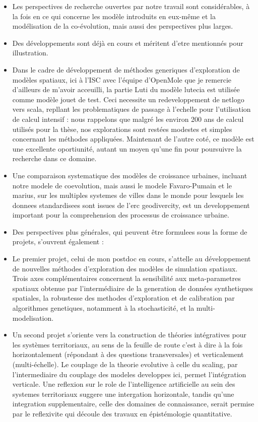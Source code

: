 \documentclass[11pt]{article}
\begin{document}
\begin{itemize}
	\item Les perspectives de recherche ouvertes par notre travail sont considérables, à la fois en ce qui concerne les modèle introduits en eux-même et la modélisation de la co-évolution, mais aussi des perspectives plus larges.
	\item Des développements sont déjà en cours et méritent d'etre mentionnés pour illustration.
	\item Dans le cadre de développement de méthodes generiques d'exploration de modèles spatiaux, ici à l'ISC avec l'équipe d'OpenMole que je remercie d'ailleurs de m'avoir acceuilli, la partie Luti du modèle lutecia est utilisée comme modèle jouet de test. Ceci necessite un redeveloppement de netlogo vers scala, repllant les problematiques de passage à l'echelle pour l'utilisation de calcul intensif : nous rappelons que malgré les environ 200 ans de calcul utilisés pour la thèse, nos explorations sont restées modestes et simples concernant les méthodes appliquées. Maintenant de l'autre coté, ce modèle est une excellente oportiunité, autant un moyen qu'une fin pour poursuivre la recherche dans ce domaine.
	\item Une comparaison systematique des modèles de croissance urbaines, incluant notre modele de coevolution, mais aussi le modele Favaro-Pumain et le marius, sur les multiples systemes de villes dans le monde pour lesquels les donnees standardisees sont issues de l'erc geodivercity, est un developpement important pour la comprehension des processus de croissance urbaine.
	\item Des perspectives plus générales, qui peuvent être formulees sous la forme de projets, s'ouvrent également :
	\item Le premier projet, celui de mon postdoc en cours, s'attelle au développement de nouvelles méthodes d'exploration des modèles de simulation spatiaux. Trois axes complémentaires concernent la sensibilité aux meta-parametres spatiaux obtenue par l'intermédiaire de la generation de données synthetiques spatiales, la robustesse des methodes d'exploration et de calibration par algorithmes genetiques, notamment à la stochasticité, et la multi-modelisation.
	\item Un second projet s'oriente vers la construction de théories intégratives pour les systèmes territoriaux, au sens de la feuille de route c'est à dire à la fois horizontalement (répondant à des questions transversales) et verticalement (multi-échelle). Le couplage de la theorie evolutive à celle du scaling, par l'intermediaire du couplage des modeles developpes ici, permet l'intégration verticale. Une reflexion sur le role de l'intelligence artificielle au sein des systemes territoriaux suggere une intergation horizontale, tandis qu'une integration supplementaire, celle des domaines de connaissance, serait permise par le reflexivite qui découle des travaux en épistémologie quantitative.
\end{itemize}
\end{document}
